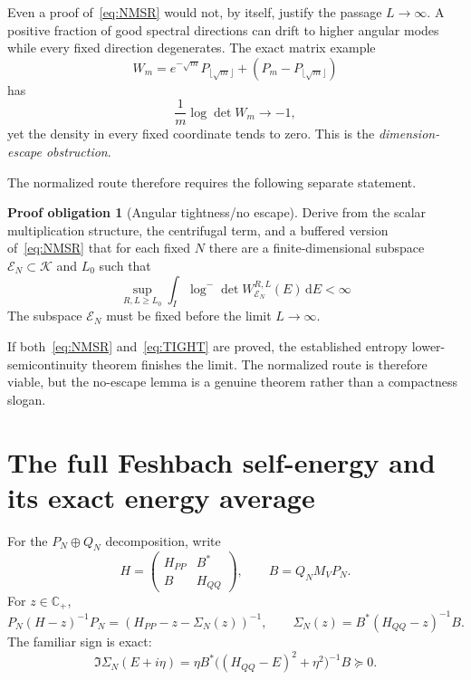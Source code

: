 \documentclass[11pt]{article}
\newcommand{\C}{\mathbb C}
\newcommand{\K}{\mathcal K}
\newcommand{\cE}{\mathcal E}
\newcommand{\dd}{\,\mathrm d}
\theoremstyle{definition}
\newtheorem{problem}[theorem]{Proof obligation}
\theoremstyle{remark}
\begin{document}
Even a proof of~\eqref{eq:NMSR} would not, by itself, justify the passage $L\to\infty$.  A positive fraction of good spectral directions can drift to higher angular modes while every fixed direction degenerates.  The exact matrix example
\begin{equation}
 W_m=e^{-\sqrt m}P_{\lfloor\sqrt m\rfloor}
 +(P_m-P_{\lfloor\sqrt m\rfloor})
\label{eq:dimension-escape}
\end{equation}
has
\begin{equation}
 \frac1m\log\det W_m\longrightarrow-1,
\end{equation}
yet the density in every fixed coordinate tends to zero.  This is the \emph{dimension-escape obstruction}.

The normalized route therefore requires the following separate statement.

\begin{problem}[Angular tightness/no escape]\label{prob:tightness}
Derive from the scalar multiplication structure, the centrifugal term, and a buffered version of~\eqref{eq:NMSR} that for each fixed $N$ there are a finite-dimensional subspace $\cE_N\subset\K$ and $L_0$ such that
\begin{equation}
 \sup_{R,L\geq L_0}
 \int_I\log^-\det W_{\cE_N}^{R,L}(E)\dd E<\infty
 \label{eq:TIGHT}
\end{equation}
The subspace $\cE_N$ must be fixed before the limit $L\to\infty$.
\end{problem}

If both~\eqref{eq:NMSR} and~\eqref{eq:TIGHT} are proved, the established entropy lower-semicontinuity theorem finishes the limit.  The normalized route is therefore viable, but the no-escape lemma is a genuine theorem rather than a compactness slogan.

\section{The full Feshbach self-energy and its exact energy average}

For the $P_N\oplus Q_N$ decomposition, write
\begin{equation}
 H=
 \begin{pmatrix}
 H_{PP}&B^*\\ B&H_{QQ}
 \end{pmatrix},
 \qquad B=Q_NM_VP_N.
 \label{eq:block-H}
\end{equation}
For $z\in\C_+$,
\begin{equation}
 P_N(H-z)^{-1}P_N
 =\left(H_{PP}-z-\Sigma_N(z)\right)^{-1},
 \qquad
 \Sigma_N(z)=B^*(H_{QQ}-z)^{-1}B.
 \label{eq:feshbach}
\end{equation}
The familiar sign is exact:
\begin{equation}
 \Im\Sigma_N(E+i\eta)
 =\eta B^*\bigl((H_{QQ}-E)^2+\eta^2\bigr)^{-1}B\succeq0.
 \label{eq:selfenergy-positive}
\end{equation}
\end{document}
